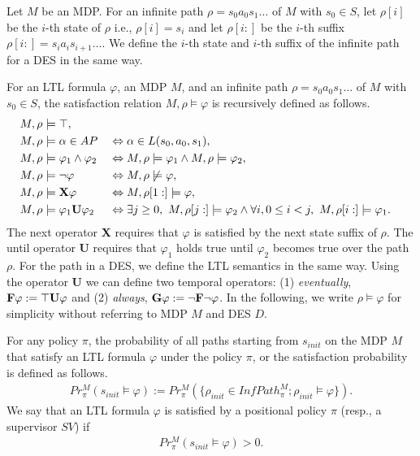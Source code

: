 Let $ M $ be an MDP.
For an infinite path $\rho = s_0a_0s_1 \ldots $ of $ M $ with $ s_0 \in S $, let $\rho[i]$ be the $i$-th state of $\rho$ i.e., $\rho[i]=s_i$ and let $\rho[i:]$ be the $i$-th suffix $\rho[i:]=s_ia_is_{i+1} \ldots $. We define the $i$-th state and $i$-th suffix of the infinite path for a DES in the same way.
\begin{definition}
	For an LTL formula $\varphi$, an MDP $M$, and an infinite path $\rho = s_0a_0s_1 \ldots$ of $ M $ with $ s_0 \in S $, the satisfaction relation $M,\rho \models \varphi$ is recursively defined as follows.
	\begin{alignat}{2}
	& M, \rho \models \top,\nonumber \\
	& M, \rho \models \alpha \in AP &&\Leftrightarrow \alpha \in L(s_0,a_0,s_1),\nonumber \\
	& M, \rho \models \varphi_1 \land \varphi_2 &&\Leftrightarrow M, \rho \models \varphi_1 \land M, \rho \models \varphi_2,\nonumber \\
	& M, \rho \models \neg \varphi &&\Leftrightarrow M, \rho \not\models \varphi,\nonumber \\
	& M, \rho \models \text{{\bf X}}\varphi &&\Leftrightarrow M, \rho[1:] \models \varphi,\nonumber \\
	& M, \rho \models \varphi_1 \text{{\bf U}} \varphi_2 &&\Leftrightarrow \exists j \geq 0, \ M, \rho[j:] \models \varphi_2 \land \forall i, 0\leq i < j, \ M, \rho[i:] \models \varphi_1.\nonumber
	\end{alignat}
The next operator {\bf X} requires that $\varphi$ is satisfied by the next state suffix of $\rho$. The until operator {\bf U} requires that $\varphi_1$ holds true until $\varphi_2$ becomes true over the path $\rho$. For the path in a DES, we define the LTL semantics in the same way.
Using the operator {\bf U} we can define two temporal operators: (1) {\it eventually}, $\text{{\bf F}} \varphi := \top \text{{\bf U}} \varphi $ and (2) {\it always}, $\text{{\bf G}} \varphi := \neg \text{{\bf F}} \neg \varphi$.
In the following, we write $ \rho \models \varphi $ for simplicity without referring to MDP $ M $ and DES $D$.


For any policy $\pi$, the probability of all paths starting from $s_{init}$ on the MDP $M$ that satisfy an LTL formula $\varphi$ under the policy $\pi$, or the satisfaction probability is defined as follows.
\begin{align*}
Pr^{M}_{\pi}(s_{init} \! \models \varphi) := Pr^{M}_{\pi}(\{ \rho_{init} \! \in \! InfPath^{M}_{\pi} ; \rho_{init} \! \models \varphi \}).
\end{align*}
We say that an LTL formula $\varphi$ is satisfied by a positional policy $\pi$ (resp., a supervisor $SV$) if
\begin{align*}
Pr^{M}_{\pi}(s_{init} \models \varphi) > 0.
\end{align*}




\end{definition}
